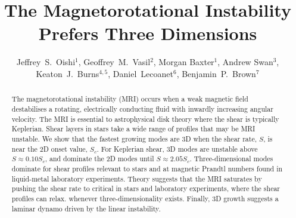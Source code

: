 \documentclass[openacc]{rsproca_new}%
\begin{document}
\title{The Magnetorotational Instability Prefers Three Dimensions}

\author{%
Jeffrey~S.~Oishi$^{1}$, Geoffrey~M.~Vasil$^{2}$, Morgan Baxter$^{1}$,
Andrew Swan$^{3}$, Keaton~J.~Burns$^{4,5}$, Daniel~Lecoanet$^6$, Benjamin~P.~Brown$^7$}

\address{$^{1}$Bates College Department of Physics and Astronomy, Lewiston, ME 04240, USA\\
$^{2}$University of Sydney School of Mathematics and Statistics, Sydney, NSW, Australia\\
$^{3}$Statistical Laboratory, DPMMS, University of Cambridge, Cambridge,
UK\\
$^{4}5$Center for Computational Astrophysics, Flatiron Institute, New York, NY 10010, USA\\
$^{5}$Massachusetts Institute of Technology Department of Physics, Cambridge, MA 02139, USA\\
$^{6}$Princeton University Department of Astrophysical Sciences, Princeton, NJ 08544, USA\\
$^{7}$University of Colorado Department of Astrophysical and Planetary Sciences, Boulder, CO 80309, USA}

\begin{abstract}
The magnetorotational instability (MRI) occurs when a weak magnetic field destabilises a rotating, electrically conducting fluid with inwardly increasing angular velocity.
The MRI is essential to astrophysical disk theory where the shear is typically Keplerian.
Shear layers in stars take a wide range of profiles that may be MRI unstable.
We show that the fastest growing modes are 3D when the shear rate, $S$, is near the 2D onset value, $S_c$.
For Keplerian shear, 3D modes are unstable above $S\approx0.10S_c$, and dominate the 2D modes until $S\approx2.05S_{c}$.
Three-dimensional modes dominate for shear profiles relevant to stars and at magnetic Prandtl numbers found in liquid-metal laboratory experiments.
Theory suggests that the MRI saturates by pushing the shear rate to critical in stars and laboratory experiments, where the shear profiles can relax.
whenever three-dimensionality exists.
Finally, 3D growth suggests a laminar dynamo driven by the linear instability.
\end{abstract}

\maketitle
\end{document}
